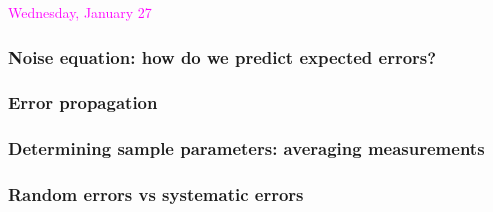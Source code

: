 \documentclass[12pt]{article}
\begin{document}
\newpage
\noindent \textcolor{magenta}{Wednesday, January 27}\\

\subsubsection*{Noise equation: how do we predict expected errors?}
\subsubsection*{Error propagation}
\subsubsection*{Determining sample parameters: averaging measurements}
\subsubsection*{Random errors vs systematic errors}
\end{document}
